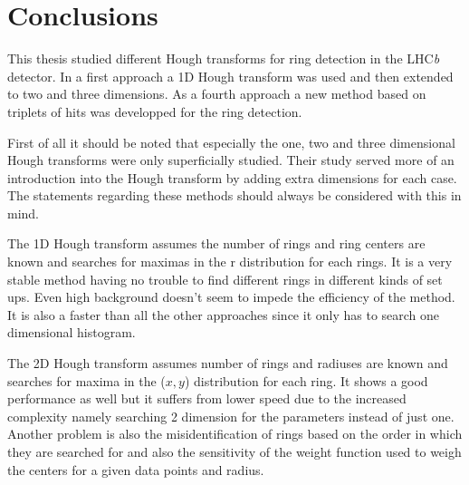 \documentclass[11pt,twoside]{scrreprt}
\begin{document}

\chapter{Conclusions} %
\label{cha:conclusions}

This thesis studied different Hough transforms for ring detection in the LHC\textit{b} detector. In a first approach a 1D Hough 
transform was used and then extended to two and three dimensions.
As a fourth approach a new method based on triplets of hits was developped for the ring detection. 

First of all it should be noted that especially the one, two and three dimensional Hough transforms were only superficially studied. Their study served more of an introduction into the Hough transform by adding extra dimensions for each case. The statements regarding these methods should always be considered with this in mind.

The 1D Hough transform assumes the number of rings and ring centers are known and searches for maximas in the r distribution for each rings.
It is a very stable method having no trouble to find different rings in different kinds of set ups. Even high background doesn't seem to impede the efficiency of the method. It is also a faster than all the other approaches since it only has to search one dimensional histogram.

The 2D Hough transform assumes number of rings and radiuses are known and searches for maxima in the ($x,y$) distribution for each ring. It shows a good performance as well but it suffers from lower speed due to the increased complexity namely searching
2 dimension for the parameters instead of just one. Another problem is also the misidentification of rings based on the order in which
they are searched for and also the sensitivity of the weight function used to weigh the centers for a given data points and radius.
\end{document}
